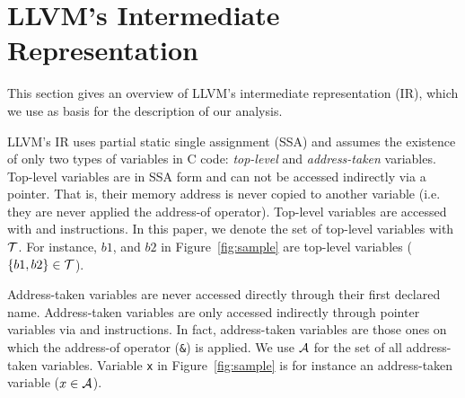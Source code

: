 \section{LLVM's Intermediate Representation}\label{sec:llvm}

This section gives an overview of LLVM's intermediate
representation (IR), which we use as basis for the
description of our analysis.

LLVM's IR uses partial static single assignment (SSA)
and assumes the existence of only two types of variables
in C code: \textit{top-level} and \textit{address-taken}
variables.
Top-level variables are in SSA form and can not be
accessed indirectly via a pointer. That is, their memory
address is never copied to another variable (i.e. they are
never applied the address-of operator). Top-level variables
are accessed with \alloct and \copyt instructions.
In this paper, we denote the set of top-level variables
with $\mathcal{T}$. For instance, $b1$, and $b2$ in Figure~\ref{fig:sample}
are top-level variables ($\{b1, b2\} \in \mathcal{T}$).

Address-taken variables are never accessed directly through
their first declared name. Address-taken variables are only
accessed indirectly through pointer variables via \loadt and
\storet instructions. In fact, address-taken variables
are those ones on which the address-of operator (\texttt{\&})
is applied. We use $\mathcal{A}$ for the set of all address-taken
variables. Variable \texttt{x} in Figure~\ref{fig:sample} is
for instance an address-taken variable ($x \in \mathcal{A}$).

\begin{comment}
We capture program elements using the following abstract
instructions:
\begin{itemize}
\item $\copydef$: copy instruction. $p, q \in \Aset$.
\item $\loaddef$: load instruction. $q \in \Aset$.
\item $\addrofdef$: address-of operator. $p \in \Aset, a \in \Pset$.
\item $\storedef$: store instruction. $p \in \Aset, q \in \Pset$.
\item $\sourcedef$: call to a taint source function. $r \in \Pset$
\item $\calldef$: call to a function. $r \in \Pset$
\item $\sinkdef$: call to sink function. $r \in \Pset$
\end{itemize}
\end{comment}
